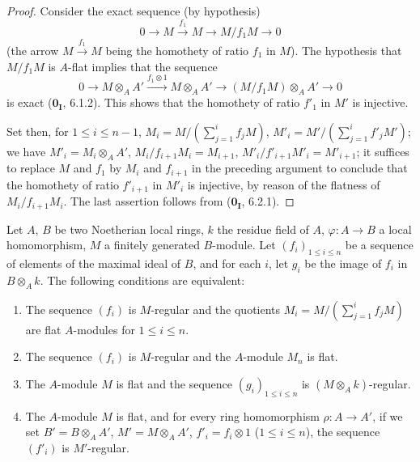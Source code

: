 \begin{proof}
Consider the exact sequence (by hypothesis)
\[
  0 \to M \xrightarrow{f_1} M \to M/f_1M \to 0
\]
(the arrow $M\xrightarrow{f_1}M$ being the homothety of ratio $f_1$ in $M$).
The hypothesis that $M/f_1M$ is $A$-flat implies that the sequence
\[
  0 \to M\otimes_AA' \xrightarrow{f_1\otimes 1} M\otimes_AA' \to (M/f_1M)\otimes_AA' \to 0
\]
is exact ($\mathbf{0_I}$, 6.1.2).
This shows that the homothety of ratio $f'_1$ in $M'$ is injective.

Set then, for $1\leq i\leq n-1$, $M_i=M/(\sum_{j=1}^i f_jM)$, $M'_i=M'/(\sum_{j=1}^i f'_jM')$;
we have $M'_i=M_i\otimes_AA'$, $M_i/f_{i+1}M_i=M_{i+1}$, $M'_i/f'_{i+1}M'_i=M'_{i+1}$;
it suffices to replace $M$ and $f_1$ by $M_i$ and $f_{i+1}$ in the preceding argument to conclude that the homothety of ratio $f'_{i+1}$ in $M'_i$ is injective, by reason of the flatness of $M_i/f_{i+1}M_i$.
The last assertion follows from ($\mathbf{0_I}$, 6.2.1).
\end{proof}

\begin{proposition}[15.1.16]
\label{0.15.1.16}
Let $A$, $B$ be two Noetherian local rings, $k$ the residue field of $A$, $\varphi:A\to B$ a local homomorphism, $M$ a finitely generated $B$-module.
Let $(f_i)_{1\leq i\leq n}$ be a sequence of elements of the maximal ideal of $B$, and for each $i$, let $g_i$ be the image of $f_i$ in $B\otimes_Ak$.
The following conditions are equivalent:
\begin{enumerate}
  \item[\textup{a)}] The sequence $(f_i)$ is $M$-regular and the quotients $M_i=M/(\sum_{j=1}^i f_jM)$ are flat $A$-modules for $1\leq i\leq n$.
  \item[\textup{b)}] The sequence $(f_i)$ is $M$-regular and the $A$-module $M_n$ is flat.
  \item[\textup{c)}] The $A$-module $M$ is flat and the sequence $(g_i)_{1\leq i\leq n}$ is $(M\otimes_Ak)$-regular.
  \item[\textup{d)}] The $A$-module $M$ is flat, and for every ring homomorphism $\rho:A\to A'$, if we set $B'=B\otimes_AA'$, $M'=M\otimes_AA'$, $f'_i=f_i\otimes 1$ \textup{($1\leq i\leq n$)}, the sequence $(f'_i)$ is $M'$-regular.
\end{enumerate}
\end{proposition}

